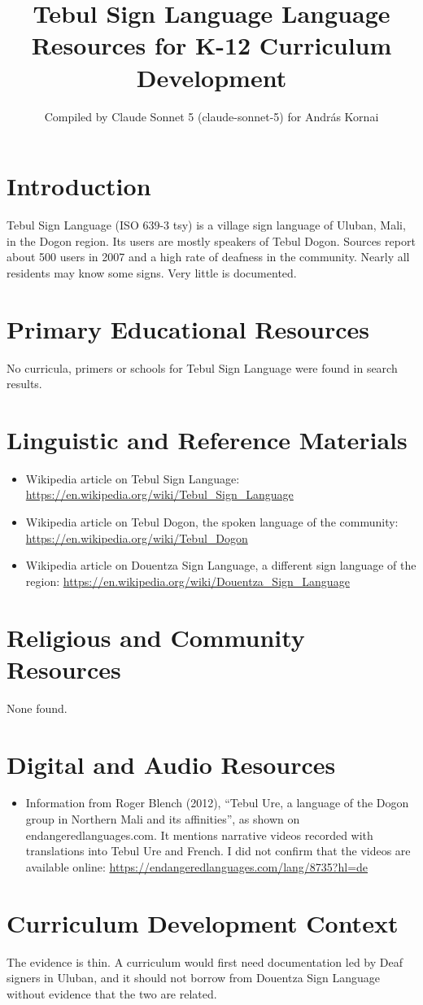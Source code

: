 \documentclass[12pt]{article}
\title{Tebul Sign Language Language Resources for K-12 Curriculum Development}
\author{Compiled by Claude Sonnet 5 (claude-sonnet-5) for Andr\'as Kornai}
\date{}
\begin{document}
\maketitle

\section{Introduction}
Tebul Sign Language (ISO 639-3 tsy) is a village sign language of Uluban, Mali, in the Dogon region. Its users are mostly speakers of Tebul Dogon. Sources report about 500 users in 2007 and a high rate of deafness in the community. Nearly all residents may know some signs. Very little is documented.

\section{Primary Educational Resources}
No curricula, primers or schools for Tebul Sign Language were found in search results.

\section{Linguistic and Reference Materials}
\begin{itemize}
\item Wikipedia article on Tebul Sign Language: \url{https://en.wikipedia.org/wiki/Tebul_Sign_Language}
\item Wikipedia article on Tebul Dogon, the spoken language of the community: \url{https://en.wikipedia.org/wiki/Tebul_Dogon}
\item Wikipedia article on Douentza Sign Language, a different sign language of the region: \url{https://en.wikipedia.org/wiki/Douentza_Sign_Language}
\end{itemize}

\section{Religious and Community Resources}
None found.

\section{Digital and Audio Resources}
\begin{itemize}
\item Information from Roger Blench (2012), ``Tebul Ure, a language of the Dogon group in Northern Mali and its affinities'', as shown on endangeredlanguages.com. It mentions narrative videos recorded with translations into Tebul Ure and French. I did not confirm that the videos are available online: \url{https://endangeredlanguages.com/lang/8735?hl=de}
\end{itemize}

\section{Curriculum Development Context}
The evidence is thin. A curriculum would first need documentation led by Deaf signers in Uluban, and it should not borrow from Douentza Sign Language without evidence that the two are related.
\end{document}
